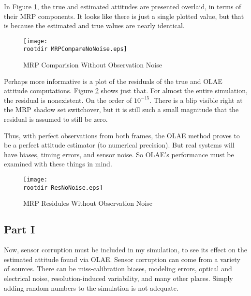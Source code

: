 \documentclass[11pt]{aiaa-tc}%
\newcommand{\rootdir}{./Figures/}
\begin{document}
In Figure \ref{fig:MRP No Noise}, the true and estimated attitudes are presented overlaid, in terms of their MRP components. It looks like there is just a single plotted value, but that is because the estimated and true values are nearly identical. 

\begin{centering}
	\begin{figure}[Hh]
		\texttt{[image: \\rootdir MRPCompareNoNoise.eps]}
		\caption{MRP Comparision Without Observation Noise}
		\label{fig:MRP No Noise}
	\end{figure}
\end{centering}

Perhaps more informative is a plot of the residuals of the true and OLAE attitude computations. Figure \ref{fig:Res No Noise} shows just that. For almost the entire simulation, the residual is nonexistent. On the order of $10^{-15}$. There is a blip visible right at the MRP shadow set switchover, but it is still such a small magnitude that the residual is assumed to still be zero. 

Thus, with perfect observations from both frames, the OLAE method proves to be a perfect attitude estimator (to numerical precision). But real systems will have biases, timing errors, and sensor noise. So OLAE's performance must be examined with these things in mind.

\begin{centering}
	\begin{figure}[Hh]
		\texttt{[image: \\rootdir ResNoNoise.eps]}
		\caption{MRP Residules Without Observation Noise}
		\label{fig:Res No Noise}
	\end{figure}
\end{centering}





\subsection{Part I}
\label{sec:OLAE Experiment}
Now, sensor corruption must be included in my simulation, to see its effect on the estimated attitude found via OLAE. Sensor corruption can come from a variety of sources. There can be miss-calibration biases, modeling errors, optical and electrical noise, resolution-induced variability, and many other places. Simply adding random numbers to the simulation is not adequate. 
\end{document}
